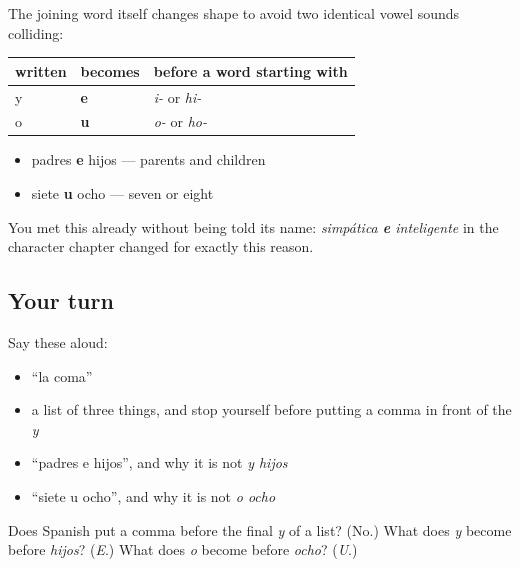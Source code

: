 \begin{grammarlens}[title={Grammar Lens: when y becomes e, and o becomes u}]
The joining word itself changes shape to avoid two identical vowel sounds colliding:

\noindent
\begin{tabularx}{\linewidth}{@{}>{\raggedright\arraybackslash}X>{\raggedright\arraybackslash}X>{\raggedright\arraybackslash}X@{}}
\toprule
\textbf{written} & \textbf{becomes} & \textbf{before a word starting with} \\
\midrule
y & \textbf{e} & \emph{i-} or \emph{hi-} \\
o & \textbf{u} & \emph{o-} or \emph{ho-} \\
\bottomrule
\end{tabularx}

\begin{itemize}
\raggedright
  \item padres \textbf{e} hijos — parents and children
  \item siete \textbf{u} ocho — seven or eight
\end{itemize}

You met this already without being told its name: \emph{simpática \textbf{e} inteligente} in the character chapter changed for exactly this reason.
\end{grammarlens}

\subsection*{Your turn}
Say these aloud:

\begin{itemize}
\raggedright
  \item \textquotedblleft{}la coma\textquotedblright{}
  \item a list of three things, and stop yourself before putting a comma in front of the \emph{y}
  \item \textquotedblleft{}padres e hijos\textquotedblright{}, and why it is not \emph{y hijos}
  \item \textquotedblleft{}siete u ocho\textquotedblright{}, and why it is not \emph{o ocho}
\end{itemize}

\begin{tcolorbox}[breakable,colback=teal!4,colframe=teal!35!black,title={Before you move on}]
Does Spanish put a comma before the final \emph{y} of a list? (No.) What does \emph{y} become before \emph{hijos}? (\emph{E}.) What does \emph{o} become before \emph{ocho}? (\emph{U}.)
\end{tcolorbox}
